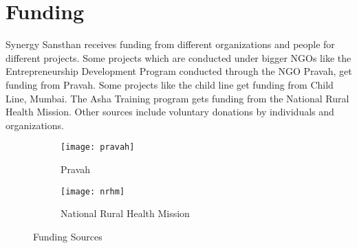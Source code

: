 \section{Funding}
	Synergy Sansthan receives funding from different organizations and people for different projects. Some projects which are conducted under bigger NGOs like the Entrepreneurship Development Program conducted through the NGO Pravah, get funding from Pravah. Some projects like the child line get funding from Child Line, Mumbai. The Asha Training program gets funding from the National Rural Health Mission. Other sources include voluntary donations by individuals and organizations.

\begin{figure}[ht!]
	\begin{subfigure}{.5\textwidth}
	  	\centering
	  	\texttt{[image: pravah]}
	  	\caption{Pravah}
	  	\label{fig:sub1}
	\end{subfigure}%
	\begin{subfigure}{.5\textwidth}
	  	\centering
	  	\texttt{[image: nrhm]}
	  	\caption{National Rural Health Mission}
	  	\label{fig:sub2}
	\end{subfigure}
	\caption{Funding Sources}
	\label{figstart}
\end{figure}










